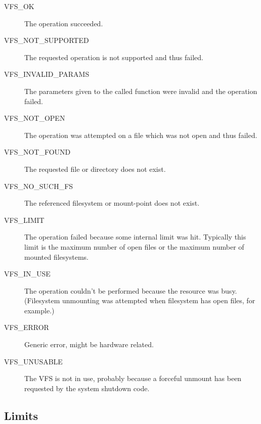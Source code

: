 \documentclass[twoside,a4paper]{report}
\begin{document}
\begin{description}

\item[VFS\_OK]  The operation
succeeded.

\item[VFS\_NOT\_SUPPORTED]
 The requested
operation is not supported and thus failed.

\item[VFS\_INVALID\_PARAMS]
 The
parameters given to the called function were invalid and the operation
failed.

\item[VFS\_NOT\_OPEN]
 The operation was
attempted on a file which was not open and thus failed.

\item[VFS\_NOT\_FOUND] 
 The requested file or
directory does not exist.

\item[VFS\_NO\_SUCH\_FS]
 The referenced
filesystem or mount-point does not exist.

\item[VFS\_LIMIT]
 The operation failed because
some internal limit was hit. Typically this limit is the maximum
number of open files or the maximum number of mounted filesystems.

\item[VFS\_IN\_USE]
 The operation couldn't be
performed because the resource was busy. (Filesystem unmounting was
attempted when filesystem has open files, for example.)

\item[VFS\_ERROR]
 Generic error, might be
hardware related.

\item[VFS\_UNUSABLE]
 The VFS is not in use,
probably because a forceful unmount has been requested by the system
shutdown code.

\end{description}

\subsection{Limits}
\end{document}
